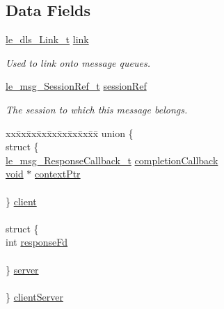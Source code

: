 \subsection*{Data Fields}
\begin{DoxyCompactItemize}
\item 
\hyperlink{structle__dls___link__t}{le\+\_\+dls\+\_\+\+Link\+\_\+t} \hyperlink{struct_message__t_aae910d35876e87b3e7a16693cb46a37b}{link}
\begin{DoxyCompactList}\small\item\em Used to link onto message queues. \end{DoxyCompactList}\item 
\hyperlink{le__messaging_8h_aebfc01e15b430a5b4f3038a5bd518904}{le\+\_\+msg\+\_\+\+Session\+Ref\+\_\+t} \hyperlink{struct_message__t_a01f203ceb4faa9bfc6064ca7e1817762}{session\+Ref}
\begin{DoxyCompactList}\small\item\em The session to which this message belongs. \end{DoxyCompactList}\item 
\begin{tabbing}
xx\=xx\=xx\=xx\=xx\=xx\=xx\=xx\=xx\=\kill
union \{\\
\>struct \{\\
\>\>\hyperlink{le__messaging_8h_a70cf756e252bb377e0443bcf89f66805}{le\_msg\_ResponseCallback\_t} \hyperlink{struct_message__t_a88bd775febafc95d43b7b6823ac7ae4e}{completionCallback}\\
\>\>\hyperlink{_t_e_m_p_l_a_t_e__cdef_8h_ac9c84fa68bbad002983e35ce3663c686}{void} $\ast$ \hyperlink{struct_message__t_ae04c998029a8dca5a3934abe44b47594}{contextPtr}\\
\>\>\\
\>\} \hyperlink{struct_message__t_aa4dc59a624915dc9e85a1741030d0fbe}{client}\\
\>\>\\
\>struct \{\\
\>\>int \hyperlink{struct_message__t_ae3d040d7597200ed9058f8d4310e1562}{responseFd}\\
\>\>\\
\>\} \hyperlink{struct_message__t_a802c78c4a40d53886ca63c2309d38113}{server}\\
\>\>\\
\} \hyperlink{struct_message__t_a0681daa30088f04b7844baf7bc15427c}{clientServer}\\


\end{tabbing}
\end{DoxyCompactItemize}
